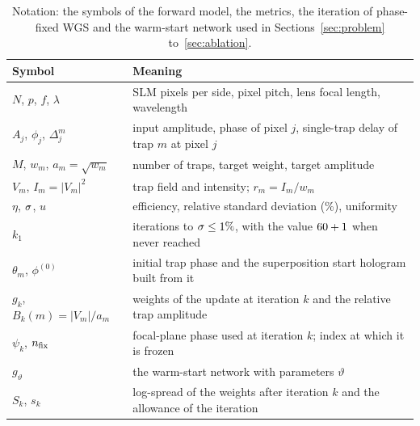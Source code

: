 \begin{table}[t]
\centering\small
\begin{tabular}{@{}ll@{}}
\toprule
Symbol & Meaning \\
\midrule
$N$, $p$, $f$, $\lambda$ & SLM pixels per side, pixel pitch, lens focal length, wavelength \\
$A_j$, $\phi_j$, $\Delta_j^m$ & input amplitude, phase of pixel $j$, single-trap delay of trap $m$ at pixel $j$ \\
$M$, $w_m$, $a_m=\sqrt{w_m}$ & number of traps, target weight, target amplitude \\
$V_m$, $I_m=|V_m|^2$ & trap field and intensity; $r_m=I_m/w_m$ \\
$\eta$, $\sigma$, $u$ & efficiency, relative standard deviation (\%), uniformity \\
$k_1$ & iterations to $\sigma\le1\%$, with the value $60+1$ when never reached \\
$\theta_m$, $\phi^{(0)}$ & initial trap phase and the superposition start hologram built from it \\
$g_k$, $B_k(m)=|V_m|/a_m$ & weights of the update at iteration $k$ and the relative trap amplitude \\
$\psi_k$, $n_{\mathrm{fix}}$ & focal-plane phase used at iteration $k$; index at which it is frozen \\
$g_\vartheta$ & the warm-start network with parameters $\vartheta$ \\
$S_k$, $s_k$ & log-spread of the weights after iteration $k$ and the allowance of the iteration \\
\bottomrule
\end{tabular}
\caption{Notation: the symbols of the forward model, the metrics, the iteration of phase-fixed WGS and the warm-start network used in Sections~\ref{sec:problem} to~\ref{sec:ablation}.}
\label{tab:notation}
\end{table}
